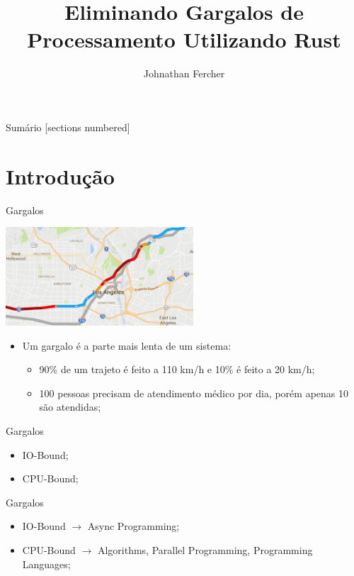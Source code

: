 \documentclass[aspectratio=169]{beamer}
\title{Eliminando Gargalos de Processamento \newline Utilizando Rust}
\date{}
\author{Johnathan Fercher}
\begin{document}
\maketitle

\begin{frame}{Sumário}
  [sections numbered]
  \tableofcontents[hideallsubsections]
\end{frame}

\section{Introdução}
\begin{frame}{Gargalos}	
	\begin{center}
		\includegraphics[width=7cm]{imgs/bottleneck}
	\end{center}
	\begin{itemize}
		\item Um gargalo é a parte mais lenta de um sistema:
		\begin{itemize}
			\item 90\% de um trajeto é feito a 110 km/h e 10\% é feito a 20 km/h;
			\item 100 pessoas precisam de atendimento médico por dia, porém apenas 10 são atendidas;
		\end{itemize}
	\end{itemize}		
\end{frame}

\begin{frame}{Gargalos}	
	\begin{itemize}
		\item IO-Bound;
		\item CPU-Bound;
	\end{itemize}	
\end{frame}

\begin{frame}{Gargalos}		
	\begin{itemize}
		\item IO-Bound $\rightarrow$ Async Programming;
		\item CPU-Bound $\rightarrow$ Algorithms, Parallel Programming, Programming Languages;
	\end{itemize}	
\end{frame}
\end{document}
